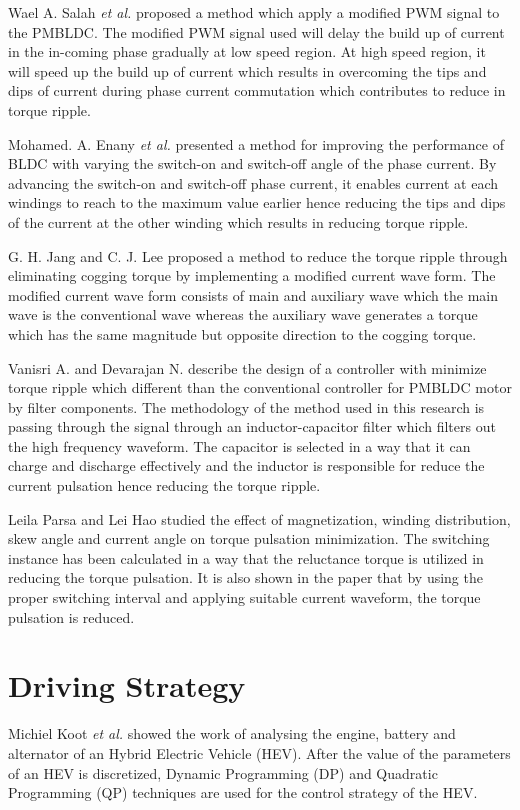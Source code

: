Wael A. Salah \textit{et al.} \citep{7648} proposed a method which apply a modified PWM signal to the PMBLDC. The modified PWM signal used will delay the build up of current in the in-coming phase gradually at low speed region. At high speed region, it will speed up the build up of current which results in overcoming the tips and dips of current during phase current commutation which contributes to reduce in torque ripple.

Mohamed. A. Enany \textit{et al.} \citep{285} presented a method for improving the performance of BLDC with varying the switch-on and switch-off angle of the phase current. By advancing the switch-on and switch-off phase current, it enables current at each windings to reach to the maximum value earlier hence reducing the tips and dips of the current at the other winding which results in reducing torque ripple.

G. H. Jang and C. J. Lee \citep{08305} proposed a method to reduce the torque ripple through eliminating cogging torque by implementing a modified current wave form. The modified current wave form consists of main and auxiliary wave which the main wave is the conventional wave whereas the auxiliary wave generates a torque which has the same magnitude but opposite direction to the cogging torque.

Vanisri A. and Devarajan N. \citep{1450216} describe the design of a controller with minimize torque ripple which different than the conventional controller for PMBLDC motor by filter components. The methodology of the method used in this research is passing through the signal through an inductor-capacitor filter which filters out the high frequency waveform. The capacitor is selected in a way that it can charge and discharge effectively and the inductor is responsible for reduce the current pulsation hence reducing the torque ripple.

Leila Parsa and Lei Hao \citep{04435197} studied the effect of magnetization, winding distribution, skew angle and current angle on torque pulsation minimization. The switching instance has been calculated in a way that the reluctance torque is utilized in reducing the torque pulsation. It is also shown in the paper that by using the proper switching interval and applying suitable current waveform, the torque pulsation is reduced. 

\section{Driving Strategy}

Michiel Koot \textit{et al.} \citep{01433223} showed the work of analysing the engine, battery and alternator of an Hybrid Electric Vehicle (HEV). After the value of the parameters of an HEV is discretized, Dynamic Programming (DP) and Quadratic Programming (QP) techniques are used for the control strategy of the HEV.


